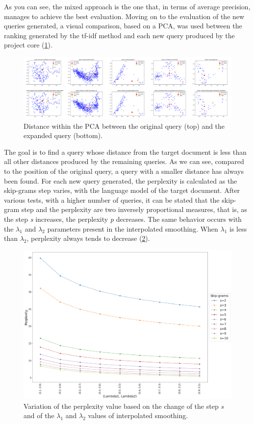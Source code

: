 As you can see, the mixed approach is the one that, in 
terms of average precision, manages to achieve the best evaluation. Moving 
on to the evaluation of the new queries generated, a visual comparison, based 
on a PCA, was used between the ranking generated by the tf-idf method and 
each new query produced by the project core (\ref{PCA}). 
\begin{figure}[h!]
    \centering
    \includegraphics[width =\linewidth]{images/PCA paper/PCA all.png}
    \centering
    \caption{Distance within the PCA between the original query (top) and the expanded query (bottom).}
    \label{PCA}
\end{figure}
The goal is to find a query 
whose distance from the target document is less than all other distances 
produced by the remaining queries. As we can see, compared to the position 
of the original query, a query with a smaller distance has always been found.
For each new query generated, the perplexity is calculated as the skip-grams 
step varies, with the language model of the target document. After various 
tests, with a higher number of queries, it can be stated that the skip-gram 
step and the perplexity are two inversely proportional measures, that is, as 
the step \emph{s} increases, the perplexity \emph{p} decreases. The same behavior occurs 
with the $\lambda_1$ and $\lambda_2$ parameters present in the interpolated smoothing. When  
$\lambda_1$ is less than  $\lambda_2$, perplexity always tends to decrease (\ref{perplexity}). 
\begin{figure}[h!]
    \centering
    \includegraphics[width =0.8\linewidth]{images/perplexity.png}
    \centering
    \caption{Variation of the perplexity value based on the change of the step \emph{s} and of the $\lambda_1$ and $\lambda_2$ values of interpolated smoothing.}
    \label{perplexity}
\end{figure}
